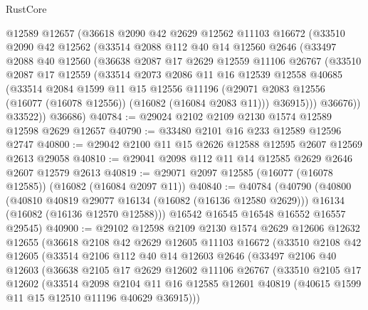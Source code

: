 \begin{lexlean}{RustCore}
\begin{coremodule}
    @12589
    @12657
    (@36618
      @2090
      @42
      @2629
      @12562
      @11103
      @16672
      (@33510
        @2090
        @42
        @12562
        (@33514
          @2088
          @112
          @40
          @14
          @12560
          @2646
          (@33497
            @2088
            @40
            @12560
            (@36638
              @2087
              @17
              @2629
              @12559
              @11106
              @26767
              (@33510
                @2087
                @17
                @12559
                (@33514
                  @2073
                  @2086
                  @11
                  @16
                  @12539
                  @12558
                  @40685
                  (@33514
                    @2084
                    @1599
                    @11
                    @15
                    @12556
                    @11196
                    (@29071 @2083 @12556 (@16077 (@16078 @12556)) (@16082 (@16084 @2083 @11)))
                    @36915)))
              @36676))
          @33522))
      @36686)
@40784 := @29024 @2102 @2109 @2130 @1574 @12589 @12598 @2629 @12657
@40790 := @33480 @2101 @16 @233 @12589 @12596 @2747
@40800 := @29042 @2100 @11 @15 @2626 @12588 @12595 @2607 @12569 @2613 @29058
@40810 := @29041 @2098 @112 @11 @14 @12585 @2629 @2646 @2607 @12579 @2613
@40819 := @29071 @2097 @12585 (@16077 (@16078 @12585)) (@16082 (@16084 @2097 @11))
@40840 := @40784
    (@40790
      (@40800
        (@40810 @40819 @29077 @16134 (@16082 (@16136 @12580 @2629)))
        @16134
        (@16082 (@16136 @12570 @12588)))
      @16542
      @16545
      @16548
      @16552
      @16557
      @29545)
@40900 := @29102
    @12598
    @2109
    @2130
    @1574
    @2629
    @12606
    @12632
    @12655
    (@36618
      @2108
      @42
      @2629
      @12605
      @11103
      @16672
      (@33510
        @2108
        @42
        @12605
        (@33514
          @2106
          @112
          @40
          @14
          @12603
          @2646
          (@33497
            @2106
            @40
            @12603
            (@36638
              @2105
              @17
              @2629
              @12602
              @11106
              @26767
              (@33510
                @2105
                @17
                @12602
                (@33514
                  @2098
                  @2104
                  @11
                  @16
                  @12585
                  @12601
                  @40819
                  (@40615 @1599 @11 @15 @12510 @11196 @40629 @36915)))

\end{coremodule}
\end{lexlean}
